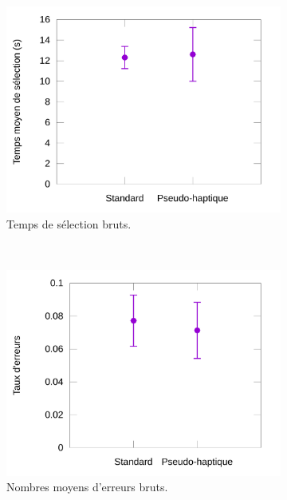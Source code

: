 	
	\begin{figure}[htbp]
		\begin{subfigure}[t]{0.49\textwidth}
			\centering
			\includegraphics[width=\textwidth]{figures/ch5/phRawTimes}
			\caption{Temps de sélection bruts.}
			\label{fig:phRawTimes}
		\end{subfigure}
		~
		\begin{subfigure}[t]{0.49\textwidth}
			\centering
			\includegraphics[width=\textwidth]{figures/ch5/phRawErrors}
			\caption{Nombres moyens d'erreurs bruts.}
			\label{fig:phRawErrors}
		\end{subfigure}
		~
		\begin{subfigure}[t]{0.49\textwidth}
			\centering

\end{subfigure}
\end{figure}
